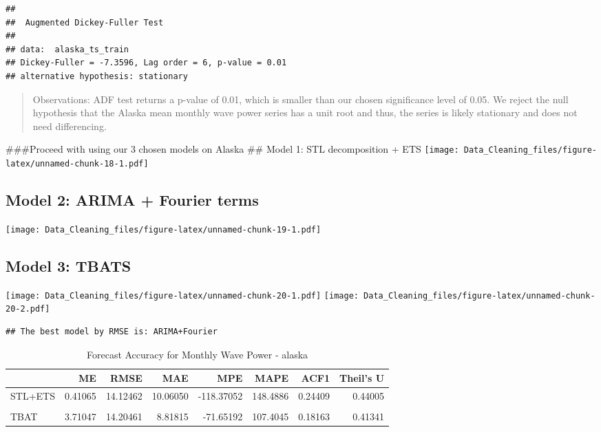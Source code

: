 \documentclass[
]{article}
\begin{document}
\begin{verbatim}
## 
##  Augmented Dickey-Fuller Test
## 
## data:  alaska_ts_train
## Dickey-Fuller = -7.3596, Lag order = 6, p-value = 0.01
## alternative hypothesis: stationary
\end{verbatim}

\begin{quote}
Observations: ADF test returns a p-value of 0.01, which is smaller than
our chosen significance level of 0.05. We reject the null hypothesis
that the Alaska mean monthly wave power series has a unit root and thus,
the series is likely stationary and does not need differencing.
\end{quote}

\#\#\#Proceed with using our 3 chosen models on Alaska \#\# Model 1: STL
decomposition + ETS
\texttt{[image: Data\_Cleaning\_files/figure-latex/unnamed-chunk-18-1.pdf]}

\subsection{Model 2: ARIMA + Fourier
terms}\label{model-2-arima-fourier-terms}

\texttt{[image: Data\_Cleaning\_files/figure-latex/unnamed-chunk-19-1.pdf]}

\subsection{Model 3: TBATS}\label{model-3-tbats}

\texttt{[image: Data\_Cleaning\_files/figure-latex/unnamed-chunk-20-1.pdf]}
\texttt{[image: Data\_Cleaning\_files/figure-latex/unnamed-chunk-20-2.pdf]}

\begin{verbatim}
## The best model by RMSE is: ARIMA+Fourier
\end{verbatim}

\begin{table}[!h]
\centering\centering
\caption{\label{tab:unnamed-chunk-21}Forecast Accuracy for Monthly Wave Power - alaska}
\centering
\begin{tabular}[t]{l|r|r|r|r|r|r|r}
\hline
  & ME & RMSE & MAE & MPE & MAPE & ACF1 & Theil's U\\
\hline
STL+ETS & 0.41065 & 14.12462 & 10.06050 & -118.37052 & 148.4886 & 0.24409 & 0.44005\\
\hline
\cellcolor{gray!10}{ARIMA+Fourier} & \cellcolor{gray!10}{2.70368} & \cellcolor{gray!10}{13.68095} & \cellcolor{gray!10}{9.00760} & \cellcolor{gray!10}{-79.91860} & \cellcolor{gray!10}{115.1316} & \cellcolor{gray!10}{0.19990} & \cellcolor{gray!10}{0.39252}\\
\hline
TBAT & 3.71047 & 14.20461 & 8.81815 & -71.65192 & 107.4045 & 0.18163 & 0.41341\\
\hline
\end{tabular}
\end{table}
\end{document}
